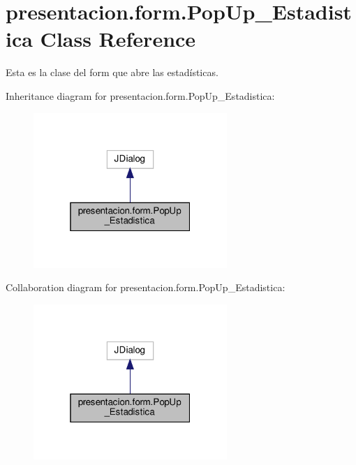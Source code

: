 \hypertarget{classpresentacion_1_1form_1_1PopUp__Estadistica}{}\section{presentacion.\+form.\+Pop\+Up\+\_\+\+Estadistica Class Reference}
\label{classpresentacion_1_1form_1_1PopUp__Estadistica}


Esta es la clase del form que abre las estadísticas.  




Inheritance diagram for presentacion.\+form.\+Pop\+Up\+\_\+\+Estadistica\+:
\nopagebreak
\begin{figure}[H]
\begin{center}
\leavevmode
\includegraphics[width=208pt]{classpresentacion_1_1form_1_1PopUp__Estadistica__inherit__graph}
\end{center}
\end{figure}


Collaboration diagram for presentacion.\+form.\+Pop\+Up\+\_\+\+Estadistica\+:
\nopagebreak
\begin{figure}[H]
\begin{center}
\leavevmode
\includegraphics[width=208pt]{classpresentacion_1_1form_1_1PopUp__Estadistica__coll__graph}
\end{center}
\end{figure}

